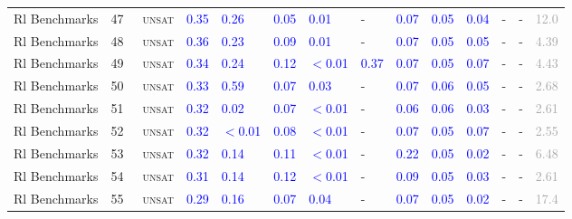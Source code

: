 \begin{center}
{\begin{longtable}{@{}llllllllllllll@{}}
Rl Benchmarks & 47 & ~\textsc{unsat} & \textcolor{blue}{0.35} & \textcolor{blue}{0.26} & \textcolor{blue}{0.05} & \textcolor{blue}{0.01} & - & \textcolor{blue}{0.07} & \textcolor{blue}{0.05} & \textcolor{blue}{0.04} & - & - & \textcolor{darkgray}{12.0} \\
Rl Benchmarks & 48 & ~\textsc{unsat} & \textcolor{blue}{0.36} & \textcolor{blue}{0.23} & \textcolor{blue}{0.09} & \textcolor{blue}{0.01} & - & \textcolor{blue}{0.07} & \textcolor{blue}{0.05} & \textcolor{blue}{0.05} & - & - & \textcolor{darkgray}{4.39} \\
Rl Benchmarks & 49 & ~\textsc{unsat} & \textcolor{blue}{0.34} & \textcolor{blue}{0.24} & \textcolor{blue}{0.12} & \textcolor{blue}{$<$0.01} & \textcolor{blue}{0.37} & \textcolor{blue}{0.07} & \textcolor{blue}{0.05} & \textcolor{blue}{0.07} & - & - & \textcolor{darkgray}{4.43} \\
Rl Benchmarks & 50 & ~\textsc{unsat} & \textcolor{blue}{0.33} & \textcolor{blue}{0.59} & \textcolor{blue}{0.07} & \textcolor{blue}{0.03} & - & \textcolor{blue}{0.07} & \textcolor{blue}{0.06} & \textcolor{blue}{0.05} & - & - & \textcolor{darkgray}{2.68} \\
Rl Benchmarks & 51 & ~\textsc{unsat} & \textcolor{blue}{0.32} & \textcolor{blue}{0.02} & \textcolor{blue}{0.07} & \textcolor{blue}{$<$0.01} & - & \textcolor{blue}{0.06} & \textcolor{blue}{0.06} & \textcolor{blue}{0.03} & - & - & \textcolor{darkgray}{2.61} \\
Rl Benchmarks & 52 & ~\textsc{unsat} & \textcolor{blue}{0.32} & \textcolor{blue}{$<$0.01} & \textcolor{blue}{0.08} & \textcolor{blue}{$<$0.01} & - & \textcolor{blue}{0.07} & \textcolor{blue}{0.05} & \textcolor{blue}{0.07} & - & - & \textcolor{darkgray}{2.55} \\
Rl Benchmarks & 53 & ~\textsc{unsat} & \textcolor{blue}{0.32} & \textcolor{blue}{0.14} & \textcolor{blue}{0.11} & \textcolor{blue}{$<$0.01} & - & \textcolor{blue}{0.22} & \textcolor{blue}{0.05} & \textcolor{blue}{0.02} & - & - & \textcolor{darkgray}{6.48} \\
Rl Benchmarks & 54 & ~\textsc{unsat} & \textcolor{blue}{0.31} & \textcolor{blue}{0.14} & \textcolor{blue}{0.12} & \textcolor{blue}{$<$0.01} & - & \textcolor{blue}{0.09} & \textcolor{blue}{0.05} & \textcolor{blue}{0.03} & - & - & \textcolor{darkgray}{2.61} \\
Rl Benchmarks & 55 & ~\textsc{unsat} & \textcolor{blue}{0.29} & \textcolor{blue}{0.16} & \textcolor{blue}{0.07} & \textcolor{blue}{0.04} & - & \textcolor{blue}{0.07} & \textcolor{blue}{0.05} & \textcolor{blue}{0.02} & - & - & \textcolor{darkgray}{17.4} \\

\end{longtable}}
\end{center}
